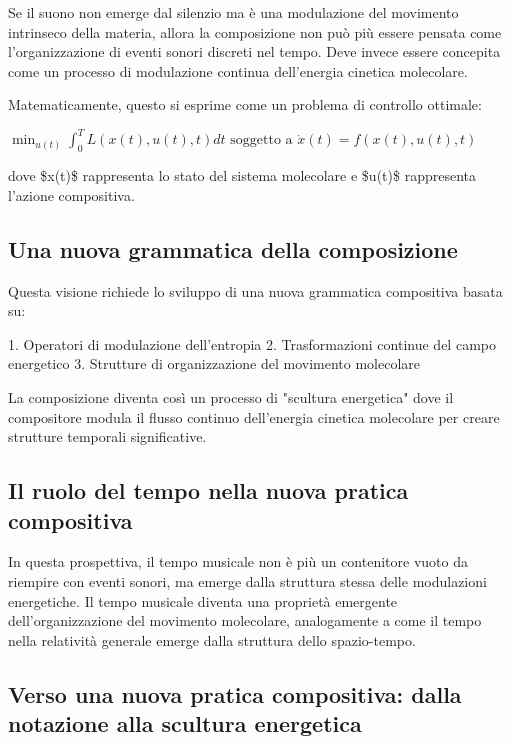 \documentclass[a4paper,11pt]{article}
\begin{document}
Se il suono non emerge dal silenzio ma è una modulazione del movimento
intrinseco della materia, allora la composizione non può più essere
pensata come l'organizzazione di eventi sonori discreti nel tempo. Deve
invece essere concepita come un processo di modulazione continua
dell'energia cinetica molecolare.

Matematicamente, questo si esprime come un problema di controllo
ottimale:

$\min_{u(t)} \int_0^T L(x(t), u(t), t)dt$
$\text{soggetto a } \dot{x}(t) = f(x(t), u(t), t)$

dove \$x(t)\$ rappresenta lo stato del sistema molecolare e \$u(t)\$
rappresenta l'azione compositiva.

\subsection{Una nuova grammatica della composizione}\hypertarget{una-nuova-grammatica-della-composizione}{}\label{una-nuova-grammatica-della-composizione}

Questa visione richiede lo sviluppo di una nuova grammatica compositiva
basata su:

1. Operatori di modulazione dell'entropia 2. Trasformazioni continue
del campo energetico 3. Strutture di organizzazione del movimento
molecolare

La composizione diventa così un processo di "scultura energetica" dove
il compositore modula il flusso continuo dell'energia cinetica
molecolare per creare strutture temporali significative.

\subsection{Il ruolo del tempo nella nuova pratica compositiva}\hypertarget{il-ruolo-del-tempo-nella-nuova-pratica-compositiva}{}\label{il-ruolo-del-tempo-nella-nuova-pratica-compositiva}

In questa prospettiva, il tempo musicale non è più un contenitore vuoto
da riempire con eventi sonori, ma emerge dalla struttura stessa delle
modulazioni energetiche. Il tempo musicale diventa una proprietà
emergente dell'organizzazione del movimento molecolare, analogamente a
come il tempo nella relatività generale emerge dalla struttura dello
spazio-tempo.

\subsection{Verso una nuova pratica compositiva: dalla notazione alla scultura energetica}\hypertarget{verso-una-nuova-pratica-compositiva-dalla-notazione-alla-scultura-energetica}{}\label{verso-una-nuova-pratica-compositiva-dalla-notazione-alla-scultura-energetica}
\end{document}
